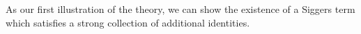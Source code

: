 \begin{comment}
Does weak consistency lead to new ternary terms?
Have two paradigms for quasiorder on subsets of {x,y,z}:
{} < {x} < {y} < {z} < {x,y} < {x,z} < {y,z} < {x,y,z}, or
{} < {x} < {y} ~ {x,y} < {z} ~ {x,z} < {y,z} < {x,y,z}.
For first paradigm:
- can't take {y} to {x}, so y always meets y or z
- can't take {z} to {x} or {y}, so either z meets z or z meets both x and y
- can't take any pair to any singleton
enough to keep track of four states: {x}, {y}, {z}, and "not singleton"
For second paradigm:
- can't take {y} to {x}, so y always meets y or z
- can't take {z} to any subset of {x,y}, so z always meets z
- {y,z} can only go to {y,z} or {x,y,z}, so one of y or z meets y (automatic if you look at the reversed relation)
so just need y to meet y or z and z to meet z to be safe.
enough to keep track of three states: {x}, "{y} or {x,y}", "contains z": state is max of elements

How much of this generalizes to the vague situation?
- {x,y,z} is strictly maximal
- still have a strict total order on singletons, suppose wlog we have {x} < {y} < {z}
- extends the inclusion order
- complementation reverses it
- {x} must be the (strictly) minimal element
- if any pair is identified, then we have {x} < {y} ~ {x,y} < {z} ~ {x,z} < {y,z} < {x,y,z}.
only new possibility is {x} < {y} < {x,y} < {z} < {x,z} < {y,z} < {x,y,z}, exhaustive casework shows this can always be replaced with second paradigm for size three stuff
- what about higher numbers of variables? Can we still make the substitution?
\end{comment}

As our first illustration of the theory, we can show the existence of a Siggers term which satisfies a strong collection of additional identities.

